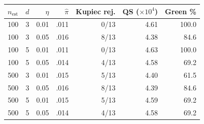 \begin{tabular}{@{}rrr rrrr@{}}
\hline\hline
$n_\text{est}$ & $d$ & $\eta$ & $\hat\pi$ & Kupiec rej.
& QS ($\times10^{4}$) & Green \% \\
\hline
100 & 3 & 0.01 & .011 & 0/13 & 4.61 & 100.0 \\
100 & 3 & 0.05 & .016 & 8/13 & 4.38 & 84.6 \\
100 & 5 & 0.01 & .011 & 0/13 & 4.63 & 100.0 \\
100 & 5 & 0.05 & .014 & 4/13 & 4.58 & 69.2 \\
500 & 3 & 0.01 & .015 & 5/13 & 4.40 & 61.5 \\
500 & 3 & 0.05 & .016 & 8/13 & 4.39 & 84.6 \\
500 & 5 & 0.01 & .015 & 5/13 & 4.59 & 69.2 \\
500 & 5 & 0.05 & .014 & 4/13 & 4.58 & 69.2 \\
\hline\hline
\end{tabular}
